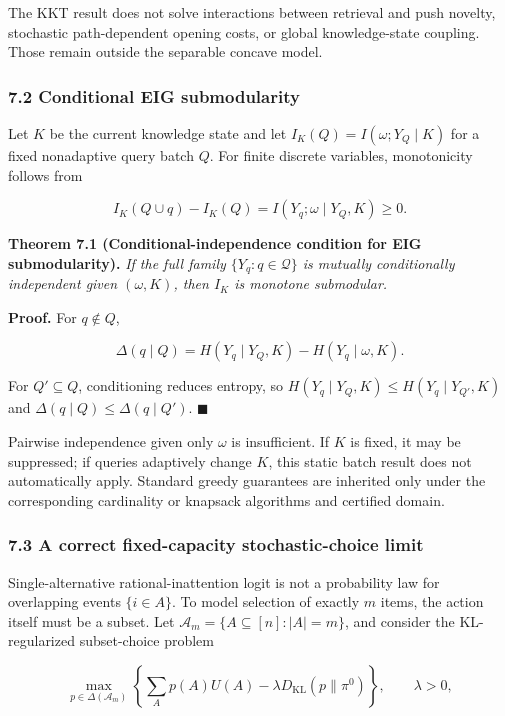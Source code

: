 \documentclass[
  11pt]{article}
\begin{document}
The KKT result does not solve interactions between retrieval and push
novelty, stochastic path-dependent opening costs, or global
knowledge-state coupling. Those remain outside the separable concave
model.

\subsubsection{7.2 Conditional EIG
submodularity}\label{conditional-eig-submodularity}

Let \(K\) be the current knowledge state and let
\(I_K(Q)=I(\omega;Y_Q\mid K)\) for a fixed nonadaptive query batch
\(Q\). For finite discrete variables, monotonicity follows from

\[I_K(Q\cup q)-I_K(Q)=I(Y_q;\omega\mid Y_Q,K)\ge0.\]

\textbf{Theorem 7.1 (Conditional-independence condition for EIG
submodularity).} \emph{If the full family \(\{Y_q:q\in\mathcal Q\}\) is
mutually conditionally independent given \((\omega,K)\), then \(I_K\) is
monotone submodular.}

\textbf{Proof.} For \(q\notin Q\),

\[\Delta(q\mid Q)=H(Y_q\mid Y_Q,K)-H(Y_q\mid\omega,K).\]

For \(Q'\subseteq Q\), conditioning reduces entropy, so
\(H(Y_q\mid Y_Q,K)\le H(Y_q\mid Y_{Q'},K)\) and
\(\Delta(q\mid Q)\le\Delta(q\mid Q')\). \(\blacksquare\)

Pairwise independence given only \(\omega\) is insufficient. If \(K\) is
fixed, it may be suppressed; if queries adaptively change \(K\), this
static batch result does not automatically apply. Standard greedy
guarantees are inherited only under the corresponding cardinality or
knapsack algorithms and certified domain.

\subsubsection{7.3 A correct fixed-capacity stochastic-choice
limit}\label{a-correct-fixed-capacity-stochastic-choice-limit}

Single-alternative rational-inattention logit is not a probability law
for overlapping events \(\{i\in A\}\). To model selection of exactly
\(m\) items, the action itself must be a subset. Let
\(\mathcal A_m=\{A\subseteq[n]:|A|=m\}\), and consider the
KL-regularized subset-choice problem

\[\max_{p\in\Delta(\mathcal A_m)}\left\{\sum_A p(A)U(A)-\lambda D_{\mathrm{KL}}(p\|\pi^0)\right\},\qquad \lambda>0,\]
\end{document}
